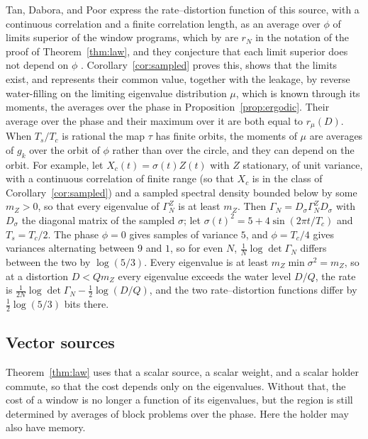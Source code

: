 \documentclass[11pt,onecolumn]{IEEEtran}
\begin{document}
Tan, Dabora, and Poor \cite[Theorem~1]{tan2024} express the
rate--distortion function of this source, with a continuous correlation
and a finite correlation length, as an average over $\phi$ of limits
superior of the window programs, which by \cite[Lemma~24]{part3} are
$r_N$ in the notation of the proof of Theorem~\ref{thm:law}, and they
conjecture that each limit superior does not depend on $\phi$
\cite[Remark~1]{tan2024}. Corollary~\ref{cor:sampled} proves this, shows
that the limits exist, and represents their common value, together with
the leakage, by reverse water-filling on the limiting eigenvalue
distribution $\mu$, which is known through its moments, the averages
over the phase in Proposition~\ref{prop:ergodic}. Their average over the phase and their
maximum over it \cite[Corollary~1]{tan2024} are both equal to
$r_\mu(D)$. When $T_s/T_c$ is rational the map $\tau$ has finite orbits,
the moments of $\mu$ are averages of $g_k$ over the orbit of $\phi$
rather than over the circle, and they can depend on the orbit. For
example, let $X_c(t)=\sigma(t)Z(t)$ with $Z$ stationary, of unit
variance, with a continuous correlation of finite range (so that $X_c$
is in the class of
Corollary~\ref{cor:sampled}) and a sampled spectral density bounded below
by some $m_Z>0$, so that every eigenvalue of $\Gamma^Z_N$ is at least
$m_Z$. Then $\Gamma_N=D_\sigma\Gamma^Z_ND_\sigma$ with $D_\sigma$ the
diagonal matrix of the sampled $\sigma$; let $\sigma(t)^2=5+4\sin(2\pi t/T_c)$ and
$T_s=T_c/2$. The phase $\phi=0$ gives samples of variance $5$, and
$\phi=T_c/4$ gives variances alternating between $9$ and $1$, so for
even $N$, $\tfrac1N\log\det\Gamma_N$ differs between the two by
$\log(5/3)$. Every eigenvalue is at least $m_Z\min\sigma^2=m_Z$, so at a
distortion $D<Qm_Z$ every eigenvalue exceeds the water level $D/Q$, the
rate is $\tfrac1{2N}\log\det\Gamma_N-\tfrac12\log(D/Q)$, and the two
rate--distortion functions differ by $\tfrac12\log(5/3)$ bits there.

\subsection{Vector sources}

Theorem~\ref{thm:law} uses that a scalar source, a scalar weight, and a
scalar holder commute, so that the cost depends only on the
eigenvalues. Without that, the cost of a window is no longer a function
of its eigenvalues, but the region is still determined by averages of
block problems over the phase. Here the holder may also have memory.
\end{document}
